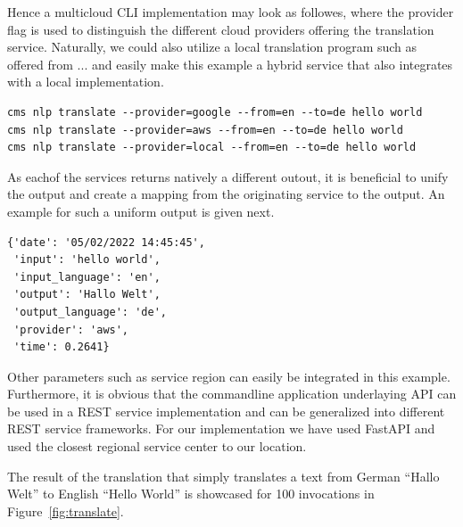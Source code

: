 Hence a multicloud CLI implementation may look as followes, where the
provider flag is used to distinguish the different cloud providers
offering the translation service. Naturally, we could also utilize a
local translation program such as offered from ... and easily make
this example a hybrid service that also integrates with a local
implementation.

\begin{Verbatim}[fontsize=\small]
cms nlp translate --provider=google --from=en --to=de hello world
cms nlp translate --provider=aws --from=en --to=de hello world
cms nlp translate --provider=local --from=en --to=de hello world
\end{Verbatim}


As eachof the services returns natively a different outout, it is
beneficial to unify the output and create a mapping from the
originating service to the output. An example for such a uniform output is given next.


\begin{Verbatim}[fontsize=\small]
{'date': '05/02/2022 14:45:45',
 'input': 'hello world',
 'input_language': 'en',
 'output': 'Hallo Welt',
 'output_language': 'de',
 'provider': 'aws',
 'time': 0.2641}
\end{Verbatim}


Other parameters such as service region can easily be integrated in
this example. Furthermore, it is obvious that the commandline
application underlaying API can be used in a REST service
implementation and can be generalized into different REST service
frameworks. For our implementation we have used FastAPI and used the
closest regional service center to our location.

The result of the translation that simply translates a text from
German ``Hallo Welt'' to English ``Hello World'' is showcased for 100
invocations in Figure~\ref{fig:translate}. 


